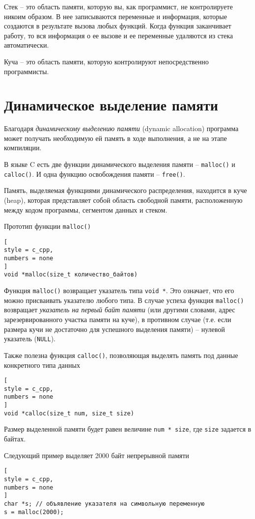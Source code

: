 \documentclass[%
	11pt,
	a4paper,
	utf8,
		]{article}
\begin{document}
Стек -- это область памяти, которую вы, как программист, не контролируете никоим образом. В нее записываются переменные и информация, которые создаются в результате вызова любых функций. Когда функция заканчивает работу, то вся информация о ее вызове и ее переменные удаляются из стека автоматически.

Куча -- это область памяти, которую контролируют непосредственно программисты.

\section{Динамическое выделение памяти}

Благодаря \emph{динамическому выделению памяти} (dynamic allocation) программа может получать необходимую ей память в ходе выполнения, а не на этапе компиляции.

В языке C есть две функции динамического выделения памяти -- \texttt{malloc()} и \texttt{calloc()}. И одна функцию освобождения памяти -- \texttt{free()}.

Память, выделяемая функциями динамического распределения, находится в куче (heap), которая представляет собой область свободной памяти, расположенную между кодом программы, сегментом данных и стеком.

Прототип функции \texttt{malloc()}
\begin{lstlisting}[
style = c_cpp,
numbers = none
]
void *malloc(size_t количество_байтов)
\end{lstlisting}
Функция \texttt{malloc()} возвращает указатель типа \texttt{void *}. Это означает, что его можно присваивать указателю любого типа. В случае успеха функция \texttt{malloc()} возвращает \emph{указатель на первый байт памяти} (или другими словами, адрес зарезервированного участка памяти на куче), в противном случае (т.е. если размера кучи не достаточно для успешного выделения памяти) -- нулевой указатель (\texttt{NULL}).

Также полезна функция \texttt{calloc()}, позволяющая выделять память под данные конкретного типа данных
\begin{lstlisting}[
style = c_cpp,
numbers = none
]
void *calloc(size_t num, size_t size)
\end{lstlisting}

Размер выделенной памяти будет равен величине \verb|num * size|, где \verb|size| задается в байтах.

Следующий пример выделяет 2000 байт непрерывной памяти
\begin{lstlisting}[
style = c_cpp,
numbers = none
]
char *s; // объявление указателя на символьную переменную
s = malloc(2000);
\end{lstlisting}
\end{document}
